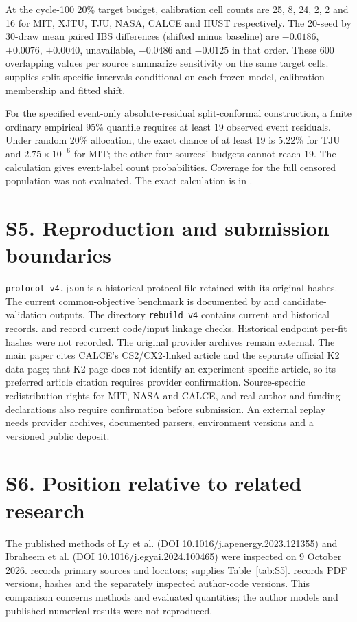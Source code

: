 \documentclass[10pt,a4paper]{article}
\begin{document}
At the cycle-100 20\% target budget, calibration cell counts are 25, 8, 24, 2, 2 and 16 for MIT, XJTU, TJU, NASA, CALCE and HUST respectively. The 20-seed by 30-draw mean paired IBS differences (shifted minus baseline) are $-0.0186$, $+0.0076$, $+0.0040$, unavailable, $-0.0486$ and $-0.0125$ in that order. These 600 overlapping values per source summarize sensitivity on the same target cells.  supplies split-specific intervals conditional on each frozen model, calibration membership and fitted shift.

For the specified event-only absolute-residual split-conformal construction, a finite ordinary empirical 95\% quantile requires at least 19 observed event residuals. Under random 20\% allocation, the exact chance of at least 19 is 5.22\% for TJU and $2.75\times10^{-6}$ for MIT; the other four sources' budgets cannot reach 19. The calculation gives event-label count probabilities. Coverage for the full censored population was not evaluated. The exact calculation is in .

\section*{S5. Reproduction and submission boundaries}
\texttt{protocol\_v4.json} is a historical protocol file retained with its original hashes. The current common-objective benchmark is documented by  and candidate-validation outputs. The directory \texttt{rebuild\_v4} contains current and historical records.  and  record current code/input linkage checks. Historical endpoint per-fit hashes were not recorded. The original provider archives remain external. The main paper cites CALCE's CS2/CX2-linked article and the separate official K2 data page; that K2 page does not identify an experiment-specific article, so its preferred article citation requires provider confirmation. Source-specific redistribution rights for MIT, NASA and CALCE, and real author and funding declarations also require confirmation before submission. An external replay needs provider archives, documented parsers, environment versions and a versioned public deposit.

\section*{S6. Position relative to related research}
The published methods of Ly et al. (DOI 10.1016/j.apenergy.2023.121355) and Ibraheem et al. (DOI 10.1016/j.egyai.2024.100465) were inspected on 9 October 2026.  records primary sources and locators;  supplies Table~\ref{tab:S5}.  records PDF versions, hashes and the separately inspected author-code versions. This comparison concerns methods and evaluated quantities; the author models and published numerical results were not reproduced.
\end{document}
